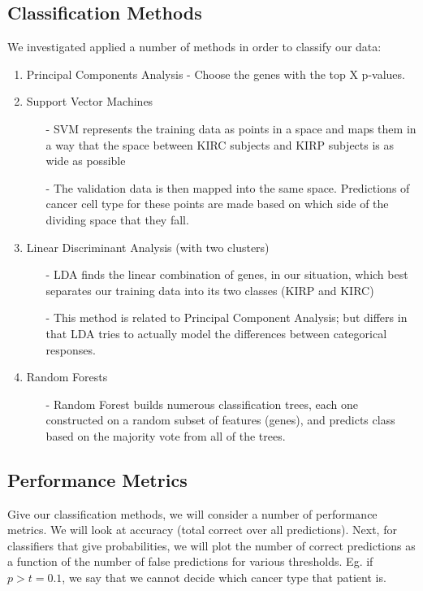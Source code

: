 \subsection{Classification Methods}

We investigated applied a number of methods in order to classify our data:

\begin{enumerate}
\item Principal Components Analysis - Choose the genes with the top X p-values. 
\item Support Vector Machines
\begin{itemize}
\item[-] SVM represents the training data as points in a space and maps them in a way
that the space between KIRC subjects and KIRP subjects is as wide as possible
\item[-] The validation data is then mapped into the same space. Predictions of cancer
cell type for these points are made based on which side of the dividing space that they fall. 
\end{itemize}
\item Linear Discriminant Analysis (with two clusters)
\begin{itemize}
\item[-] LDA finds the linear combination of genes, in our situation, which best separates our
training data into its two classes (KIRP and KIRC)
\item[-] This method is related to Principal Component Analysis; but differs in that LDA tries to
actually model the differences between categorical responses.
\end{itemize}
\item Random Forests
\begin{itemize}
\item[-] Random Forest builds numerous classification trees, each one constructed on a random subset of
features (genes), and predicts class based on the majority vote from all of the trees.
\end{itemize}
\end{enumerate}

\subsection{Performance Metrics}

Give our classification methods, we will consider a number of performance
metrics. We will look at accuracy (total correct over all predictions). Next,
for classifiers that give probabilities, we will plot the number of correct
predictions as a function of the number of false predictions for various
thresholds. Eg. if $p>t=0.1$, we say that we cannot decide which cancer type
that patient is. 

